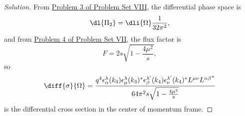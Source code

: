 \begin{proof}[Solution]
   From \href{https://github.com/louisradial/4305107-quantum-field-theory-i/releases/tag/pset8}{Problem 3 of Problem Set VIII}, the differential phase space is
   \begin{equation*}
      \dl{\Pi_2} = \dli{\Omega} \frac{1}{32\pi^2},
   \end{equation*}
   and from \href{https://github.com/louisradial/4305107-quantum-field-theory-i/releases/tag/pset7}{Problem 4 of Problem Set VII}, the flux factor is
   \begin{equation*}
      F = 2s \sqrt{1 - \frac{4\mu^2}{s}},
   \end{equation*}
   so
   \begin{equation*}
      \diff{\sigma}{\Omega} = \frac{q^4 \epsilon_\alpha^{\lambda}(k_3) \epsilon^\lambda_\mu(k_3)^* \epsilon_{\beta}^{\lambda'}(k_4) \epsilon^{\lambda'}_\nu(k_4)^* L^{\mu\nu} {L^{\alpha \beta}}^*}{64 \pi^2 s \sqrt{1 - \frac{4\mu^2}{s}}}
   \end{equation*}
   is the differential cross section in the center of momentum frame.
\end{proof}
